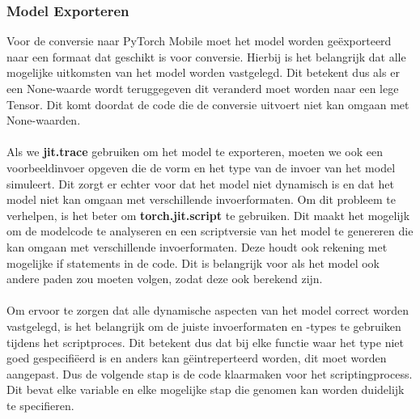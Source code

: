 \subsubsection{Model Exporteren}
\label{subsubsec:model-exporteren}
Voor de conversie naar PyTorch Mobile moet het model worden geëxporteerd naar een formaat dat geschikt is voor conversie.
Hierbij is het belangrijk dat alle mogelijke uitkomsten van het model worden vastgelegd.
Dit betekent dus als er een None-waarde wordt teruggegeven dit veranderd moet worden naar een lege Tensor.
Dit komt doordat de code die de conversie uitvoert niet kan omgaan met None-waarden.
\\
\\
Als we \textbf{jit.trace} gebruiken om het model te exporteren, moeten we ook een voorbeeldinvoer opgeven die de vorm en het type van de invoer van het model simuleert.
Dit zorgt er echter voor dat het model niet dynamisch is en dat het model niet kan omgaan met verschillende invoerformaten.
Om dit probleem te verhelpen, is het beter om \textbf{torch.jit.script} te gebruiken.
Dit maakt het mogelijk om de modelcode te analyseren en een scriptversie van het model te genereren die kan omgaan met verschillende invoerformaten.
Deze houdt ook rekening met mogelijke if statements in de code.
Dit is belangrijk voor als het model ook andere paden zou moeten volgen, zodat deze ook berekend zijn.
\\
\\
Om ervoor te zorgen dat alle dynamische aspecten van het model correct worden vastgelegd, is het belangrijk om de juiste invoerformaten en -types te gebruiken tijdens het scriptproces.
Dit betekent dus dat bij elke functie waar het type niet goed gespecifi{\"e}erd is en anders kan g{\"e}intreperteerd worden, dit moet worden aangepast.
Dus de volgende stap is de code klaarmaken voor het scriptingprocess. Dit bevat elke variable en elke mogelijke stap die genomen kan worden duidelijk te specifieren.

